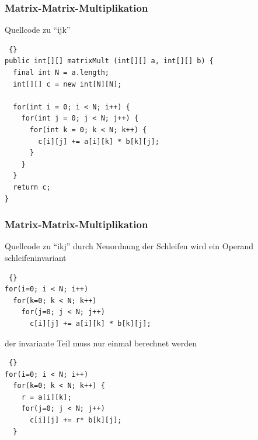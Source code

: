 
\begin{frame}[fragile]
\frametitle {Matrix-Matrix-Multiplikation} 
	\begin{block} {Quellcode zu ``ijk''}

	\begin{lstlisting} {}
public int[][] matrixMult (int[][] a, int[][] b) {
  final int N = a.length;
  int[][] c = new int[N][N];
  
  for(int i = 0; i < N; i++) {
    for(int j = 0; j < N; j++) {
      for(int k = 0; k < N; k++) {
        c[i][j] += a[i][k] * b[k][j];
      }
    }
  }
  return c;
}
	\end{lstlisting}
	\end{block} 
\end{frame}

\begin{frame}[fragile]
\frametitle {Matrix-Matrix-Multiplikation} 
	\begin{block} {Quellcode zu ``ikj''}
durch Neuordnung der Schleifen wird ein Operand schleifeninvariant \pause
	\begin{lstlisting} {}
for(i=0; i < N; i++)
  for(k=0; k < N; k++)
    for(j=0; j < N; j++)
      c[i][j] += a[i][k] * b[k][j];
	\end{lstlisting}
der invariante Teil muss nur einmal berechnet werden \pause
	\begin{lstlisting} {}
for(i=0; i < N; i++)
  for(k=0; k < N; k++) {
    r = a[i][k];
    for(j=0; j < N; j++)
      c[i][j] += r* b[k][j];
  }
	\end{lstlisting}
	\end{block} 
\end{frame}

